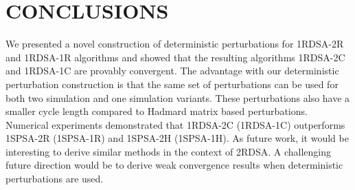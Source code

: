 \documentclass[letterpaper, 10 pt, conference]{ieeeconf}  %
\begin{document}
\section{CONCLUSIONS}
\label{sec:conclusions}
We presented a novel construction of deterministic perturbations for 
1RDSA-2R and 1RDSA-1R algorithms and showed that the resulting algorithms 
1RDSA-2C and 1RDSA-1C are provably convergent. 
The advantage with our deterministic perturbation construction is that the
same set of perturbations can be used for both two simulation
and one simulation variants. These perturbations also have a smaller cycle length compared to 
Hadmard matrix based perturbations. Numerical experiments demonstrated that 1RDSA-2C (1RDSA-1C) outperforms 
1SPSA-2R (1SPSA-1R) and 1SPSA-2H (1SPSA-1H).
As future work, it would be interesting to derive similar methods in the context of 
2RDSA. A challenging future direction would be to derive weak convergence results when
deterministic perturbations are used.



\end{document}
